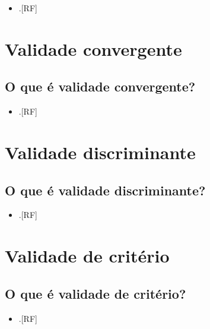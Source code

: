 \documentclass[
  a4paper,
]{book}
\providecommand{\tightlist}{%
  \setlength{\itemsep}{0pt}\setlength{\parskip}{0pt}}
\begin{document}
\begin{itemize}
\tightlist
\item
  .{[}RF{]}
\end{itemize}

\hypertarget{validade-convergente}{%
\section{Validade convergente}\label{validade-convergente}}

\hypertarget{o-que-uxe9-validade-convergente}{%
\subsection{O que é validade convergente?}\label{o-que-uxe9-validade-convergente}}

\begin{itemize}
\tightlist
\item
  .{[}RF{]}
\end{itemize}

\hypertarget{validade-discriminante}{%
\section{Validade discriminante}\label{validade-discriminante}}

\hypertarget{o-que-uxe9-validade-discriminante}{%
\subsection{O que é validade discriminante?}\label{o-que-uxe9-validade-discriminante}}

\begin{itemize}
\tightlist
\item
  .{[}RF{]}
\end{itemize}

\hypertarget{validade-criterio}{%
\section{Validade de critério}\label{validade-criterio}}

\hypertarget{o-que-uxe9-validade-de-crituxe9rio}{%
\subsection{O que é validade de critério?}\label{o-que-uxe9-validade-de-crituxe9rio}}

\begin{itemize}
\tightlist
\item
  .{[}RF{]}
\end{itemize}
\end{document}
